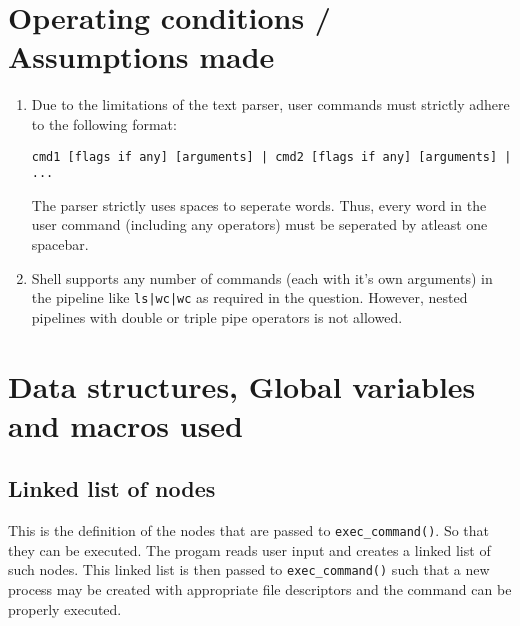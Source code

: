 \documentclass{article}
\begin{document}
\section{Operating conditions / Assumptions made}
\begin{enumerate}
\item
Due to the limitations of the text parser, user commands must strictly adhere to the following format:

\begin{lstlisting}
cmd1 [flags if any] [arguments] | cmd2 [flags if any] [arguments] | ...
\end{lstlisting}

The parser strictly uses spaces to seperate words. Thus, every word in the user command (including any operators) must be seperated by atleast one spacebar.

\item
Shell supports any number of commands (each with it's own arguments) in the pipeline like \lstinline{ls|wc|wc} as required in the question. However, nested pipelines with double or triple pipe operators is not allowed.
\end{enumerate}




\section{Data structures, Global variables and macros used}

\subsection{Linked list of nodes}

This is the definition of the nodes that are passed to \lstinline{exec_command()}. So that they can be executed. The progam reads user input and creates a linked list of such nodes. This linked list is then passed to \lstinline{exec_command()} such that a new process may be created with appropriate file descriptors and the command can be properly executed.
\end{document}
